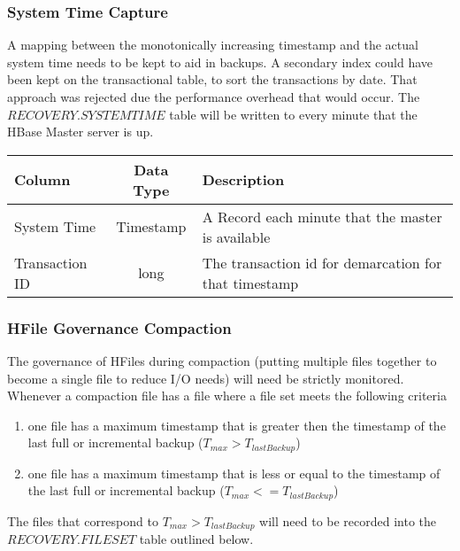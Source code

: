 \subsubsection{System Time Capture}


A mapping between the monotonically increasing timestamp and the actual system
time needs to be kept to aid in backups.  A secondary index could have been kept
on the transactional table, to sort the transactions by date.  That approach was
rejected due the performance overhead that would occur.  The
${RECOVERY.SYSTEMTIME}$ table will be written to every minute that the
HBase Master server is up.

\begin{center}
\begin{tabular}{|l|c|p{5cm}|}
				\hline
				\bf{Column}							&	\bf{Data Type}	&	\bf{Description} \\ \hline
				System Time							&	Timestamp			&	A Record each minute that the master is
				available
				\\
				\hline 
				Transaction ID							&	long			&	The transaction id for demarcation for that
				timestamp
				\\
				\hline 

	\end{tabular}
\end{center}

\subsubsection{HFile Governance Compaction}

The governance of HFiles during compaction (putting multiple files together to
become a single file to reduce I/O needs) will need be strictly monitored. 
Whenever a compaction file has a file where a file set meets the following
criteria


\begin{enumerate}
	\item one file has a maximum timestamp that is
greater then the timestamp of the last full or incremental backup ($T_{max} >
T_{lastBackup}$) 
	\item one file has a maximum timestamp that is
less or equal to the timestamp of the last full or incremental backup
($T_{max} <= T_{lastBackup}$)
	\end{enumerate}

The files that correspond to $T_{max} >
T_{lastBackup}$ will need to be recorded into the $RECOVERY.FILESET$ table
outlined below.

